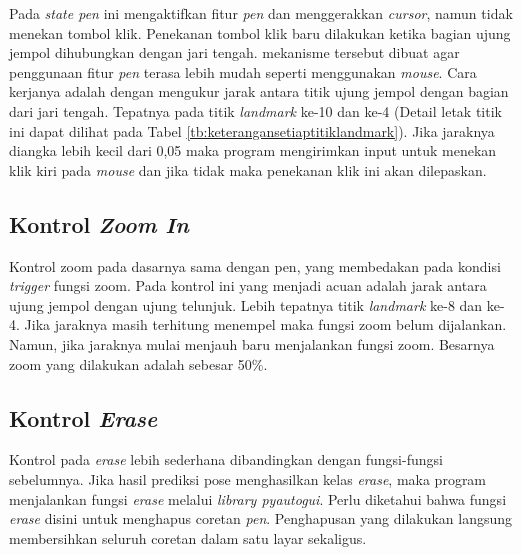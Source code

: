 Pada \emph{state pen} ini mengaktifkan fitur \emph{pen} dan menggerakkan \emph{cursor}, namun tidak menekan tombol klik. Penekanan tombol klik baru dilakukan ketika bagian ujung jempol dihubungkan dengan jari tengah. mekanisme tersebut dibuat agar penggunaan fitur \emph{pen} terasa lebih mudah seperti menggunakan \emph{mouse}. Cara kerjanya adalah dengan mengukur jarak antara titik ujung jempol dengan bagian dari jari tengah. Tepatnya pada titik \emph{landmark} ke-10 dan ke-4 (Detail letak titik ini dapat dilihat pada Tabel \ref{tb:keterangansetiaptitiklandmark}). Jika jaraknya diangka lebih kecil dari 0,05 maka program mengirimkan input untuk menekan klik kiri pada \emph{mouse} dan jika tidak maka penekanan klik ini akan dilepaskan.

\subsection{Kontrol \emph{Zoom In}}
\label{subsec:Kontrol Zoom In}

Kontrol zoom pada dasarnya sama dengan pen, yang membedakan pada kondisi \emph{trigger} fungsi zoom. Pada kontrol ini yang menjadi acuan adalah jarak antara ujung jempol dengan ujung telunjuk. Lebih tepatnya titik \emph{landmark} ke-8 dan ke-4. Jika jaraknya masih terhitung menempel maka fungsi zoom belum dijalankan. Namun, jika jaraknya mulai menjauh baru menjalankan fungsi zoom. Besarnya zoom yang dilakukan adalah sebesar 50\%. 

\subsection{Kontrol \emph{Erase}}
\label{subsec:Kontrol Erase}
Kontrol pada \emph{erase} lebih sederhana dibandingkan dengan fungsi-fungsi sebelumnya. Jika hasil prediksi pose menghasilkan kelas \emph{erase}, maka program menjalankan fungsi \emph{erase} melalui \emph{library pyautogui}. Perlu diketahui bahwa fungsi \emph{erase} disini untuk menghapus coretan \emph{pen}. Penghapusan yang dilakukan langsung membersihkan seluruh coretan dalam satu layar sekaligus.